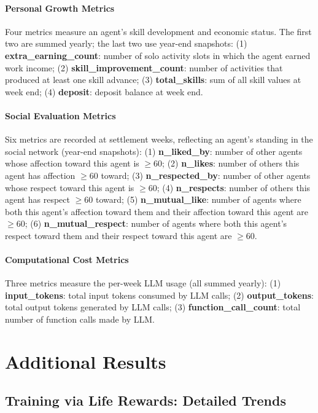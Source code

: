 \paragraph{Personal Growth Metrics}
Four metrics measure an agent's skill development and economic status.
The first two are summed yearly; the last two use year-end snapshots:
(1) \textbf{extra\_earning\_count}: number of solo activity slots in which the agent earned work income;
(2) \textbf{skill\_improvement\_count}: number of activities that produced at least one skill advance;
(3) \textbf{total\_skills}: sum of all skill values at week end;
(4) \textbf{deposit}: deposit balance at week end.

\paragraph{Social Evaluation Metrics}
Six metrics are recorded at settlement weeks, reflecting an agent's standing in the social network
(year-end snapshots):
(1) \textbf{n\_liked\_by}: number of other agents whose affection toward this agent is $\geq 60$;
(2) \textbf{n\_likes}: number of others this agent has affection $\geq 60$ toward;
(3) \textbf{n\_respected\_by}: number of other agents whose respect toward this agent is $\geq 60$;
(4) \textbf{n\_respects}: number of others this agent has respect $\geq 60$ toward;
(5) \textbf{n\_mutual\_like}: number of agents where both this agent's affection toward them and their affection toward this agent are $\geq 60$;
(6) \textbf{n\_mutual\_respect}: number of agents where both this agent's respect toward them and their respect toward this agent are $\geq 60$.

\paragraph{Computational Cost Metrics}
Three metrics measure the per-week LLM usage
(all summed yearly):
(1) \textbf{input\_tokens}: total input tokens consumed by LLM calls;
(2) \textbf{output\_tokens}: total output tokens generated by LLM calls;
(3) \textbf{function\_call\_count}: total number of function calls made by LLM.


\section{Additional Results}

\subsection{Training via Life Rewards: Detailed Trends}
\label{sec:appendix_sft_trends}

